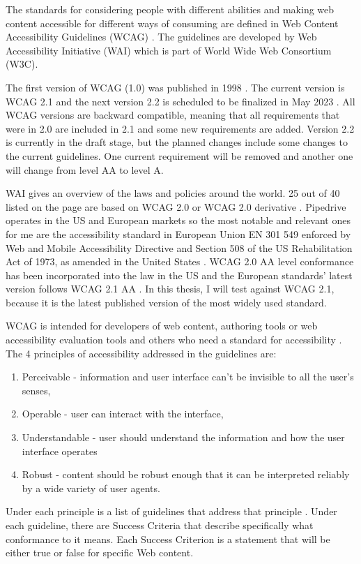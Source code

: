 \documentclass{master_thesis}
\begin{document}
The standards for considering people with different abilities and making web content accessible for different ways of consuming are defined in Web Content Accessibility Guidelines (WCAG) \citep{Kirkpatrick2018}. The guidelines are developed by Web Accessibility Initiative (WAI) which is part of World Wide Web Consortium (W3C).

The first version of WCAG (1.0) was published in 1998 \citep{Vanderheiden1998}. The current version is WCAG 2.1 and the next version 2.2 is scheduled to be finalized in May 2023 \citep{Henry2023}. All WCAG versions are backward compatible, meaning that all requirements that were in 2.0 are included in 2.1 and some new requirements are added. Version 2.2 is currently in the draft stage, but the planned changes include some changes to the current guidelines. One current requirement will be removed and another one will change from level AA to level A.

WAI gives an overview of the laws and policies around the world. 25 out of 40 listed on the page are based on WCAG 2.0 or WCAG 2.0 derivative \citep{Mueller2018}. Pipedrive operates in the US and European markets so the most notable and relevant ones for me are the accessibility standard in European Union EN 301 549 enforced by Web and Mobile Accessibility Directive \citep{MuellerEU2017} and Section 508 of the US Rehabilitation Act of 1973, as amended in the United States \citep{MuellerUS2017}. WCAG 2.0 AA level conformance has been incorporated into the law in the US and the European standards' latest version follows WCAG 2.1 AA \citep{LevelAccess2021}. In this thesis, I will test against WCAG 2.1, because it is the latest published version of the most widely used standard.


WCAG is intended for developers of web content, authoring tools or web accessibility evaluation tools and others who need a standard for accessibility \citep{Henry2023}. The 4 principles of accessibility addressed in the guidelines are:
\begin{enumerate}
	\item Perceivable - information and user interface can't be invisible to all the user's senses,
	\item Operable - user can interact with the interface,
	\item Understandable - user should understand the information and how the user interface operates
	\item Robust - content should be robust enough that it can be interpreted reliably by a wide variety of user agents.
\end{enumerate}
Under each principle is a list of guidelines that address that principle \citep{AGWGWP2022}. Under each guideline, there are Success Criteria that describe specifically what conformance to it means. Each Success Criterion is a statement that will be either true or false for specific Web content.
\end{document}
